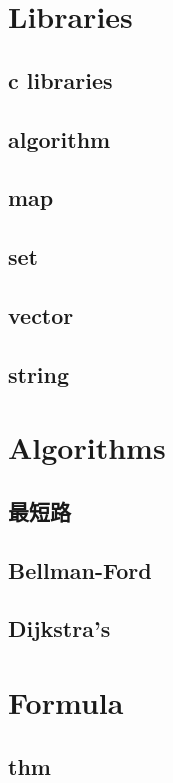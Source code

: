 \section{Libraries}
    \subsection{c libraries}
    \subsection{algorithm}
        
    \subsection{map}
    \subsection{set}
    \subsection{vector}
    \subsection{string}

\section{Algorithms}
    \subsection{最短路}
        \subsection{Bellman-Ford}
        \subsection{Dijkstra’s}

\section{Formula}
    \subsection{thm}
        